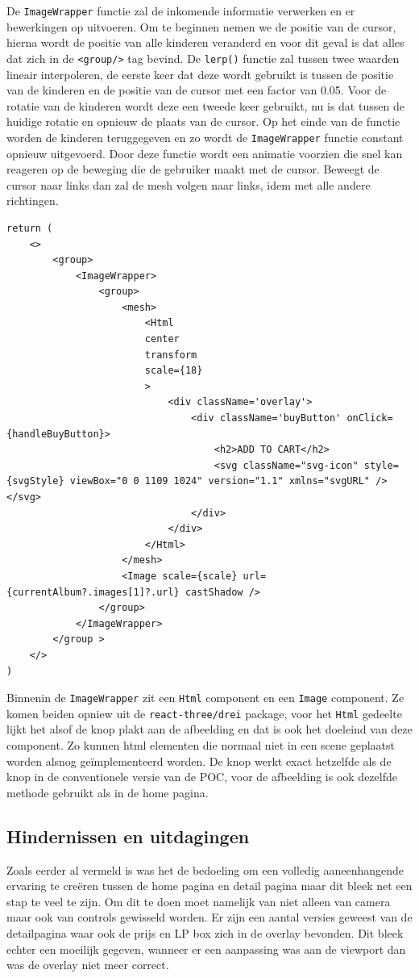 De \texttt{ImageWrapper} functie zal de inkomende informatie verwerken en er bewerkingen op uitvoeren. Om te beginnen nemen we de positie van de cursor, hierna wordt de positie van alle kinderen veranderd en voor dit geval is dat alles dat zich in de \texttt{<group/>} tag bevind. De \texttt{lerp()} functie zal tussen twee waarden lineair interpoleren, de eerste keer dat deze wordt gebruikt is tussen de positie van de kinderen en de positie van de cursor met een factor van 0.05. Voor de rotatie van de kinderen wordt deze een tweede keer gebruikt, nu is dat tussen de huidige rotatie en opnieuw de plaats van de cursor. Op het einde van de functie worden de kinderen teruggegeven en zo wordt de \texttt{ImageWrapper} functie constant opnieuw uitgevoerd. Door deze functie wordt een animatie voorzien die snel kan reageren op de beweging die de gebruiker maakt met de cursor. Beweegt de cursor naar links dan zal de mesh volgen naar links, idem met alle andere richtingen.

\begin{lstlisting}
return (
	<>
		<group>
			<ImageWrapper>
				<group>
					<mesh>
						<Html
						center
						transform
						scale={18}
						>
							<div className='overlay'>
								<div className='buyButton' onClick={handleBuyButton}>
									<h2>ADD TO CART</h2>
									<svg className="svg-icon" style={svgStyle} viewBox="0 0 1109 1024" version="1.1" xmlns="svgURL" /></svg>
								</div>
							</div>
						</Html>
					</mesh>
					<Image scale={scale} url={currentAlbum?.images[1]?.url} castShadow />
				</group>
			</ImageWrapper>
		</group >
	</>
)
\end{lstlisting}

Binnenin de \texttt{ImageWrapper} zit een \texttt{Html} component en een \texttt{Image} component. Ze komen beiden opniew uit de \texttt{react-three/drei} package, voor het \texttt{Html} gedeelte lijkt het alsof de knop plakt aan de afbeelding en dat is ook het doeleind van deze component. Zo kunnen html elementen die normaal niet in een scene geplaatst worden alsnog geïmplementeerd worden. De knop werkt exact hetzelfde als de knop in de conventionele versie van de POC, voor de afbeelding is ook dezelfde methode gebruikt als in de home pagina.

\subsection{Hindernissen en uitdagingen}

Zoals eerder al vermeld is was het de bedoeling om een volledig aaneenhangende ervaring te creëren tussen de home pagina en detail pagina maar dit bleek net een stap te veel te zijn. Om dit te doen moet namelijk van niet alleen van camera maar ook van controls gewisseld worden. Er zijn een aantal versies geweest van de detailpagina waar ook de prijs en LP box zich in de overlay bevonden. Dit bleek echter een moeilijk gegeven, wanneer er een aanpassing was aan de viewport dan was de overlay niet meer correct.


